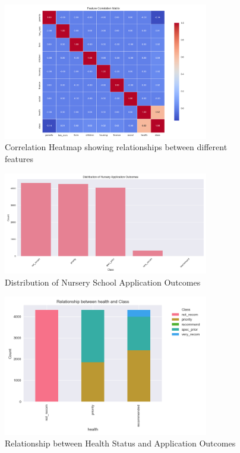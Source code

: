 \begin{figure}[h]
    \centering
    \includegraphics[width=0.8\textwidth]{results/correlation_heatmap.png}
    \caption{Correlation Heatmap showing relationships between different features}
    \label{fig:correlation}
\end{figure}

\begin{figure}[h]
    \centering
    \includegraphics[width=0.8\textwidth]{results/class_distribution_bar.png}
    \caption{Distribution of Nursery School Application Outcomes}
    \label{fig:class_dist}
\end{figure}

\begin{figure}[h]
    \centering
    \includegraphics[width=0.8\textwidth]{results/health_vs_class_stacked.png}
    \caption{Relationship between Health Status and Application Outcomes}
    \label{fig:stacked_bars}
\end{figure} 